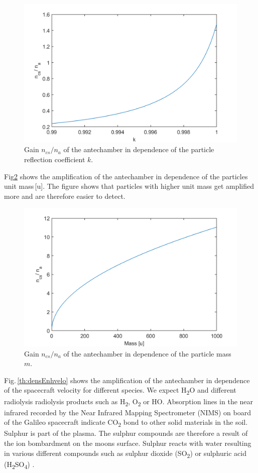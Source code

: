 		\begin{figure}[h!] %
			\centering
			\includegraphics[width= .7\textwidth]{Bilder/k.png}
			\caption{Gain $n_{cs}/n_a$ of the antechamber in dependence of the particle reflection coefficient $k$.}
			\label{th:densEnhk}
		\end{figure}
		Fig\ref{th:densEnhm} shows the amplification of the antechamber in dependence of the particles unit mass\,[u]. The figure shows that particles with higher unit mass get amplified more and are therefore easier to detect.\\
		\begin{figure}[h!] %
			\centering
			\includegraphics[width= .7\textwidth]{Bilder/m.png}
			\caption{Gain $n_{cs}/n_a$ of the antechamber in dependence of the particle mass $m$.}
			\label{th:densEnhm}
		\end{figure}
		Fig.\,\ref{th:densEnhvelo} shows the amplification of the antechamber in dependence of the spacecraft velocity for different species. We expect H\textsubscript{2}O and different radiolysis radiolysis products such as H\textsubscript{2}, O\textsubscript{2} or HO. Absorption lines in the near infrared recorded by the Near Infrared Mapping Spectrometer (NIMS) on board of the Galileo spacecraft indicate CO\textsubscript{2} bond to other solid materials in the soil. Sulphur is part of the plasma. The sulphur compounds are therefore a result of the ion bombardment on the moons surface. Sulphur reacts with water resulting in various different compounds such as sulphur dioxide (SO\textsubscript{2}) or sulphuric acid (H\textsubscript{2}SO\textsubscript{4}) \cite{Collins_2014}. 
